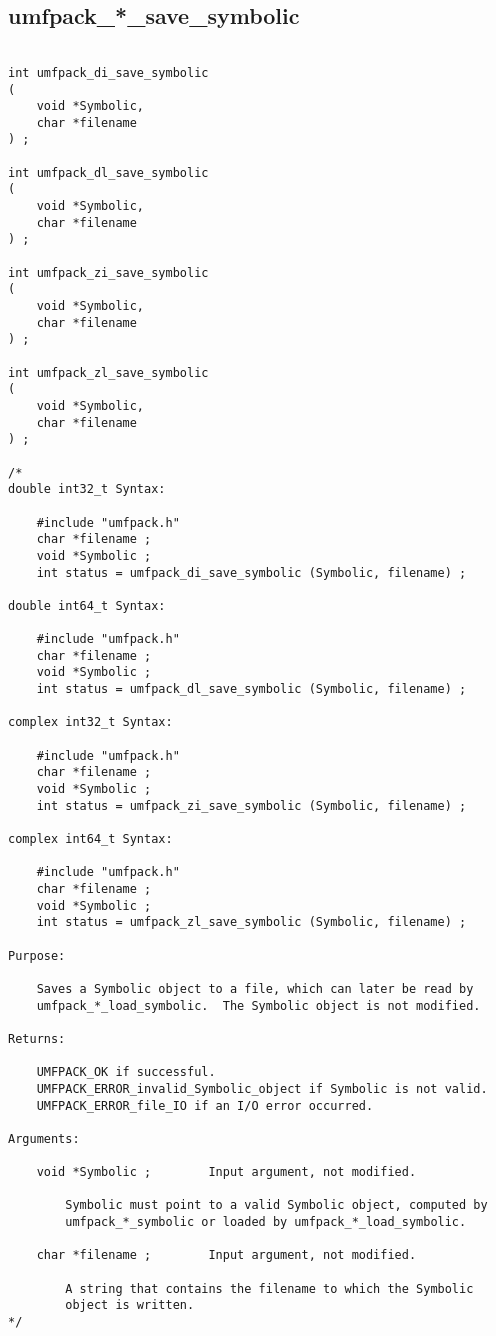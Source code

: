 \documentclass[11pt]{article}
\begin{document}
\newpage
\subsection{umfpack\_*\_save\_symbolic}

{\footnotesize
\begin{verbatim}

int umfpack_di_save_symbolic
(
    void *Symbolic,
    char *filename
) ;

int umfpack_dl_save_symbolic
(
    void *Symbolic,
    char *filename
) ;

int umfpack_zi_save_symbolic
(
    void *Symbolic,
    char *filename
) ;

int umfpack_zl_save_symbolic
(
    void *Symbolic,
    char *filename
) ;

/*
double int32_t Syntax:

    #include "umfpack.h"
    char *filename ;
    void *Symbolic ;
    int status = umfpack_di_save_symbolic (Symbolic, filename) ;

double int64_t Syntax:

    #include "umfpack.h"
    char *filename ;
    void *Symbolic ;
    int status = umfpack_dl_save_symbolic (Symbolic, filename) ;

complex int32_t Syntax:

    #include "umfpack.h"
    char *filename ;
    void *Symbolic ;
    int status = umfpack_zi_save_symbolic (Symbolic, filename) ;

complex int64_t Syntax:

    #include "umfpack.h"
    char *filename ;
    void *Symbolic ;
    int status = umfpack_zl_save_symbolic (Symbolic, filename) ;

Purpose:

    Saves a Symbolic object to a file, which can later be read by
    umfpack_*_load_symbolic.  The Symbolic object is not modified.

Returns:

    UMFPACK_OK if successful.
    UMFPACK_ERROR_invalid_Symbolic_object if Symbolic is not valid.
    UMFPACK_ERROR_file_IO if an I/O error occurred.

Arguments:

    void *Symbolic ;        Input argument, not modified.

        Symbolic must point to a valid Symbolic object, computed by
        umfpack_*_symbolic or loaded by umfpack_*_load_symbolic.

    char *filename ;        Input argument, not modified.

        A string that contains the filename to which the Symbolic
        object is written.
*/
\end{verbatim}
}
\end{document}

